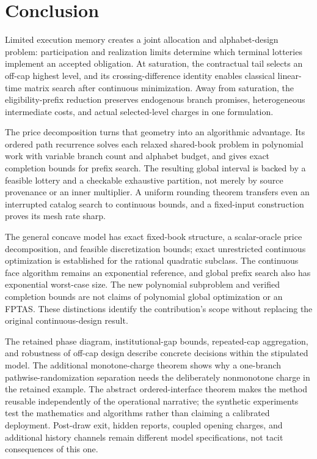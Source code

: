 \section{Conclusion}
Limited execution memory creates a joint allocation and alphabet-design problem: participation and realization limits determine which terminal lotteries implement an accepted obligation. At saturation, the contractual tail selects an off-cap highest level, and its crossing-difference identity enables classical linear-time matrix search after continuous minimization. Away from saturation, the eligibility-prefix reduction preserves endogenous branch promises, heterogeneous intermediate costs, and actual selected-level charges in one formulation.

The price decomposition turns that geometry into an algorithmic advantage. Its ordered path recurrence solves each relaxed shared-book problem in polynomial work with variable branch count and alphabet budget, and gives exact completion bounds for prefix search. The resulting global interval is backed by a feasible lottery and a checkable exhaustive partition, not merely by source provenance or an inner multiplier. A uniform rounding theorem transfers even an interrupted catalog search to continuous bounds, and a fixed-input construction proves its mesh rate sharp.

The general concave model has exact fixed-book structure, a scalar-oracle price decomposition, and feasible discretization bounds; exact unrestricted continuous optimization is established for the rational quadratic subclass. The continuous face algorithm remains an exponential reference, and global prefix search also has exponential worst-case size. The new polynomial subproblem and verified completion bounds are not claims of polynomial global optimization or an FPTAS. These distinctions identify the contribution's scope without replacing the original continuous-design result.

The retained phase diagram, institutional-gap bounds, repeated-cap aggregation, and robustness of off-cap design describe concrete decisions within the stipulated model. The additional monotone-charge theorem shows why a one-branch pathwise-randomization separation needs the deliberately nonmonotone charge in the retained example. The abstract ordered-interface theorem makes the method reusable independently of the operational narrative; the synthetic experiments test the mathematics and algorithms rather than claiming a calibrated deployment. Post-draw exit, hidden reports, coupled opening charges, and additional history channels remain different model specifications, not tacit consequences of this one.
